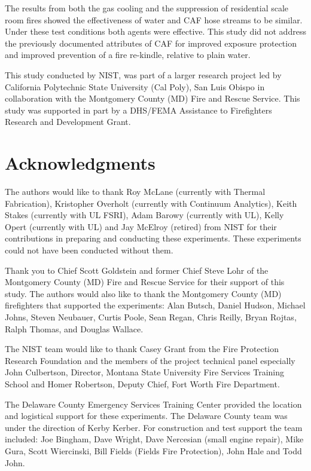 \documentclass[12pt,oneside]{book}
\begin{document}
The results from both the gas cooling and the suppression of residential scale room fires showed the effectiveness of water and CAF hose streams to be similar. Under these test conditions both agents were effective. This study did not address the previously documented attributes of CAF for improved exposure protection and improved prevention of a fire re-kindle, relative to plain water. 

This study conducted by NIST, was part of a larger research project led by California Polytechnic State University (Cal Poly), San Luis Obispo in collaboration with the Montgomery County (MD) Fire and Rescue Service. This study was supported in part by a DHS/FEMA Assistance to Firefighters Research and Development Grant.  


\chapter{Acknowledgments}
\label{chap:acknowledgments}

The authors would like to thank Roy McLane (currently with Thermal Fabrication), Kristopher Overholt (currently with Continuum Analytics), Keith Stakes (currently with UL FSRI), Adam Barowy (currently with UL), Kelly Opert (currently with UL) and Jay McElroy (retired) from NIST for their contributions in preparing and conducting these experiments. These experiments could not have been conducted without them. 

Thank you to Chief Scott Goldstein and former Chief Steve Lohr of the Montgomery County (MD) Fire and Rescue Service for their support of this study. The authors would also like to thank the Montgomery County (MD) firefighters that supported the experiments: Alan Butsch, Daniel Hudson, Michael Johns, Steven Neubauer, Curtis Poole, Sean Regan, Chris Reilly, Bryan Rojtas, Ralph Thomas, and Douglas Wallace. 

The NIST team would like to thank Casey Grant from the Fire Protection Research Foundation and the members of the project technical panel especially John Culbertson, Director, Montana State University Fire Services Training School and Homer Robertson, Deputy Chief, Fort Worth Fire Department.  

The Delaware County Emergency Services Training Center provided the location and logistical support for these experiments. The Delaware County team was under the direction of Kerby Kerber.  For construction and test support the team included: Joe Bingham, Dave Wright, Dave Nercesian (small engine repair), Mike Gura, Scott Wiercinski, Bill Fields (Fields Fire Protection), John Hale and Todd John.
\end{document}
